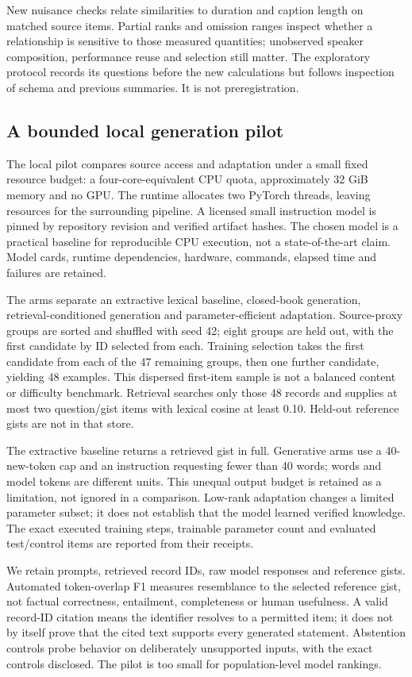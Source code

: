 New nuisance checks relate similarities to duration and caption length on matched source items. Partial ranks and omission ranges inspect whether a relationship is sensitive to those measured quantities; unobserved speaker composition, performance reuse and selection still matter. The exploratory protocol records its questions before the new calculations but follows inspection of schema and previous summaries. It is not preregistration.

\subsection{A bounded local generation pilot}
The local pilot compares source access and adaptation under a small fixed resource budget: a four-core-equivalent CPU quota, approximately 32 GiB memory and no GPU. The runtime allocates two PyTorch threads, leaving resources for the surrounding pipeline. A licensed small instruction model is pinned by repository revision and verified artifact hashes. The chosen model is a practical baseline for reproducible CPU execution, not a state-of-the-art claim. Model cards, runtime dependencies, hardware, commands, elapsed time and failures are retained.

The arms separate an extractive lexical baseline, closed-book generation, retrieval-conditioned generation and parameter-efficient adaptation. Source-proxy groups are sorted and shuffled with seed 42; eight groups are held out, with the first candidate by ID selected from each. Training selection takes the first candidate from each of the 47 remaining groups, then one further candidate, yielding 48 examples. This dispersed first-item sample is not a balanced content or difficulty benchmark. Retrieval searches only those 48 records and supplies at most two question/gist items with lexical cosine at least 0.10. Held-out reference gists are not in that store.

The extractive baseline returns a retrieved gist in full. Generative arms use a 40-new-token cap and an instruction requesting fewer than 40 words; words and model tokens are different units. This unequal output budget is retained as a limitation, not ignored in a comparison. Low-rank adaptation changes a limited parameter subset; it does not establish that the model learned verified knowledge. The exact executed training steps, trainable parameter count and evaluated test/control items are reported from their receipts.

We retain prompts, retrieved record IDs, raw model responses and reference gists. Automated token-overlap F1 measures resemblance to the selected reference gist, not factual correctness, entailment, completeness or human usefulness. A valid record-ID citation means the identifier resolves to a permitted item; it does not by itself prove that the cited text supports every generated statement. Abstention controls probe behavior on deliberately unsupported inputs, with the exact controls disclosed. The pilot is too small for population-level model rankings.

